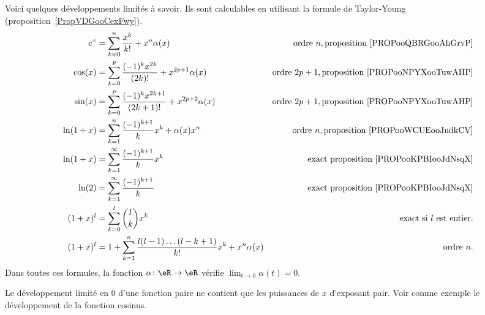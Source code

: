 \begin{description}
	      Voici quelques développements limités à savoir. Ils sont calculables en utilisant la formule de Taylor-Young (proposition~\ref{PropVDGooCexFwy}).
	      \begin{subequations}
		      \begin{align*}
			      e^x      & =\sum_{k=0}^n\frac{ x^k }{ k! }+x^n\alpha(x)                      & \text{ordre } n, \text{proposition \ref{PROPooQBRGooAhGrvP}}   \\
			      \cos(x)  & =\sum_{k=0}^p\frac{ (-1)^kx^{2k} }{ (2k)! }+x^{2p+1}\alpha(x)     & \text{ordre } 2p+1,\text{proposition \ref{PROPooNPYXooTuwAHP}} \\
			      \sin(x)  & =\sum_{k=0}^p\frac{ (-1)^kx^{2k+1} }{ (2k+1)! }+x^{2p+2}\alpha(x) & \text{ordre } 2p+1,\text{proposition \ref{PROPooNPYXooTuwAHP}} \\
			      \ln(1+x) & =\sum_{k=1}^n\frac{ (-1)^{k+1} }{ k }x^k+\alpha(x)x^n             & \text{ordre }n,\text{proposition \ref{PROPooWCUEooJudkCV}}     \\
			      \ln(1+x) & =\sum_{k=1}^{\infty}\frac{ (-1)^{k+1} }{ k }x^k                   & \text{exact }\text{proposition \ref{PROPooKPBIooJdNsqX}}       \\
			      \ln(2)   & =\sum_{k=1}^{\infty}\frac{ (-1)^{k+1} }{ k }                      & \text{exact }\text{proposition \ref{PROPooKPBIooJdNsqX}}       \\
			      (1+x)^l  & =\sum_{k=0}^l\binom{ l }{ k }x^k                                  & \text{exact si } l\text{ est entier.}                          \\
			      (1+x)^l  & =1+\sum_{k=1}^n\frac{l(l-1)\ldots(l-k+1) }{ k! }x^k+x^n\alpha(x)  & \text{ordre } n.
		      \end{align*}
	      \end{subequations}
	      Dans toutes ces formules, la fonction \( \alpha\colon \eR\to \eR\) vérifie \( \lim_{t\to 0} \alpha(t)=0\).

	      Le développement limité en \( 0\) d'une fonction paire ne contient que les puissances de \( x\) d'exposant pair. Voir comme exemple le développement de la fonction cosinus.

\end{description}

